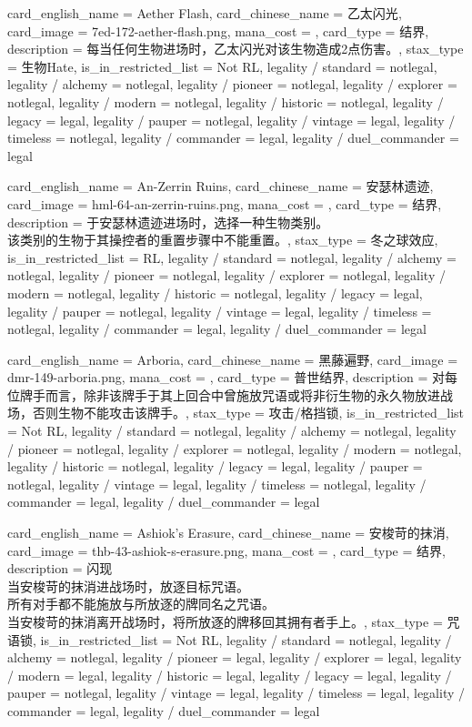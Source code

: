 \documentclass[lang = cn, color = black, 10pt]{AllThatStax}
\begin{document}
\card
{
	card_english_name = {Aether Flash},
	card_chinese_name = {乙太闪光},
	card_image = 7ed-172-aether-flash.png,
	mana_cost = ,
	card_type = 结界,
	description = {每当任何生物进场时，乙太闪光对该生物造成2点伤害。},
	stax_type = 生物Hate,
	is_in_restricted_list = Not RL,
	legality / standard = notlegal,
	legality / alchemy = notlegal,
	legality / pioneer = notlegal,
	legality / explorer = notlegal,
	legality / modern = notlegal,
	legality / historic = notlegal,
	legality / legacy = legal,
	legality / pauper = notlegal,
	legality / vintage = legal,
	legality / timeless = notlegal,
	legality / commander = legal,
	legality / duel_commander = legal
}

\card
{
	card_english_name = {An-Zerrin Ruins},
	card_chinese_name = {安瑟林遗迹},
	card_image = hml-64-an-zerrin-ruins.png,
	mana_cost = ,
	card_type = 结界,
	description = {于安瑟林遗迹进场时，选择一种生物类别。\\
该类别的生物于其操控者的重置步骤中不能重置。},
	stax_type = 冬之球效应,
	is_in_restricted_list = RL,
	legality / standard = notlegal,
	legality / alchemy = notlegal,
	legality / pioneer = notlegal,
	legality / explorer = notlegal,
	legality / modern = notlegal,
	legality / historic = notlegal,
	legality / legacy = legal,
	legality / pauper = notlegal,
	legality / vintage = legal,
	legality / timeless = notlegal,
	legality / commander = legal,
	legality / duel_commander = legal
}

\card
{
	card_english_name = {Arboria},
	card_chinese_name = {黑藤遍野},
	card_image = dmr-149-arboria.png,
	mana_cost = ,
	card_type = 普世结界,
	description = {对每位牌手而言，除非该牌手于其上回合中曾施放咒语或将非衍生物的永久物放进战场，否则生物不能攻击该牌手。},
	stax_type = 攻击/格挡锁,
	is_in_restricted_list = Not RL,
	legality / standard = notlegal,
	legality / alchemy = notlegal,
	legality / pioneer = notlegal,
	legality / explorer = notlegal,
	legality / modern = notlegal,
	legality / historic = notlegal,
	legality / legacy = legal,
	legality / pauper = notlegal,
	legality / vintage = legal,
	legality / timeless = notlegal,
	legality / commander = legal,
	legality / duel_commander = legal
}

\card
{
	card_english_name = {Ashiok's Erasure},
	card_chinese_name = {安梭苛的抹消},
	card_image = thb-43-ashiok-s-erasure.png,
	mana_cost = ,
	card_type = 结界,
	description = {闪现\\
当安梭苛的抹消进战场时，放逐目标咒语。\\
所有对手都不能施放与所放逐的牌同名之咒语。\\
当安梭苛的抹消离开战场时，将所放逐的牌移回其拥有者手上。},
	stax_type = 咒语锁,
	is_in_restricted_list = Not RL,
	legality / standard = notlegal,
	legality / alchemy = notlegal,
	legality / pioneer = legal,
	legality / explorer = legal,
	legality / modern = legal,
	legality / historic = legal,
	legality / legacy = legal,
	legality / pauper = notlegal,
	legality / vintage = legal,
	legality / timeless = legal,
	legality / commander = legal,
	legality / duel_commander = legal
}
\end{document}
